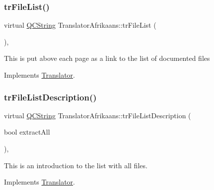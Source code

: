 \mbox{\label{class_translator_afrikaans_a60321bc5dd63cdd36d60cde0537698dd}} 
\subsubsection{\texorpdfstring{trFileList()}{trFileList()}}
{\footnotesize\ttfamily virtual \mbox{\hyperlink{class_q_c_string}{Q\+C\+String}} Translator\+Afrikaans\+::tr\+File\+List (\begin{DoxyParamCaption}{ }\end{DoxyParamCaption})\hspace{0.3cm}{\ttfamily [inline]}, {\ttfamily [virtual]}}

This is put above each page as a link to the list of documented files 

Implements \mbox{\hyperlink{class_translator}{Translator}}.

\mbox{\label{class_translator_afrikaans_aae90075ddbc357ce1f23044985f2201f}} 
\subsubsection{\texorpdfstring{trFileListDescription()}{trFileListDescription()}}
{\footnotesize\ttfamily virtual \mbox{\hyperlink{class_q_c_string}{Q\+C\+String}} Translator\+Afrikaans\+::tr\+File\+List\+Description (\begin{DoxyParamCaption}\item[{bool}]{extract\+All }\end{DoxyParamCaption})\hspace{0.3cm}{\ttfamily [inline]}, {\ttfamily [virtual]}}

This is an introduction to the list with all files. 

Implements \mbox{\hyperlink{class_translator}{Translator}}.

\mbox{\label{class_translator_afrikaans_a6582375b582fb646c0c6ec2229925e64}} 
